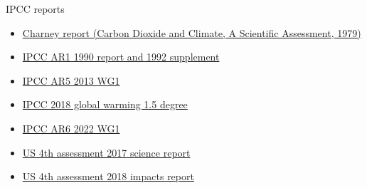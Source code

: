 \documentclass[twoside,authoryear,round,12pt]{article}
\begin{document}

\centerline{IPCC reports}
\bigskip
\bigskip

\begin{itemize}
\item \href{https://nap.nationalacademies.org/catalog/12181/carbon-dioxide-and-climate-a-scientific-assessment}{Charney report (Carbon Dioxide and Climate, A Scientific Assessment, 1979)}

\item \href{https://www.ipcc.ch/site/assets/uploads/2018/05/ipcc_90_92_assessments_far_full_report.pdf}{IPCC AR1 1990 report and 1992 supplement}

\item \href{https://www.ipcc.ch/site/assets/uploads/2018/02/WG1AR5_all_final.pdf}{IPCC AR5 2013 WG1}

\item \href{https://www.ipcc.ch/site/assets/uploads/sites/2/2019/06/SR15_Full_Report_High_Res.pdf}{IPCC 2018 global warming 1.5 degree}

\item \href{https://www.ipcc.ch/report/ar6/wg1/downloads/report/IPCC_AR6_WGI_FullReport.pdf}{IPCC AR6 2022 WG1}   

\item \href{https://science2017.globalchange.gov/downloads/CSSR2017_FullReport.pdf}{US 4th assessment 2017 science report}

\item \href{https://nca2018.globalchange.gov/downloads/NCA4_2018_FullReport.pdf}{US 4th assessment 2018 impacts report}

\end{itemize}

% 
% 
\end{document}
